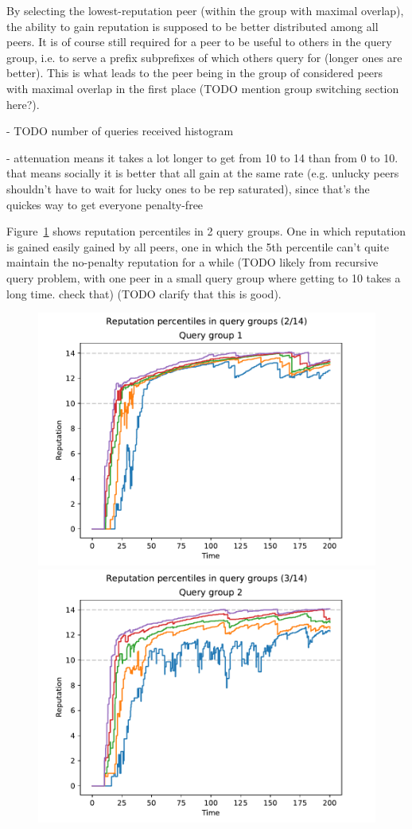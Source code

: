 By selecting the lowest-reputation peer (within the group with maximal overlap),
the ability to gain reputation is supposed to be better distributed among all
peers. It is of course still required for a peer to be useful to others in the
query group, i.e. to serve a prefix subprefixes of which others query for
(longer ones are better). This is what leads to the peer being in the group of
considered peers with maximal overlap in the first place (TODO mention group
switching section here?).

- TODO number of queries received histogram

- attenuation means it takes a lot longer to get from 10 to 14 than from 0 to
  10. that means socially it is better that all gain at the same rate (e.g.
  unlucky peers shouldn't have to wait for lucky ones to be rep saturated),
  since that's the quickes way to get everyone penalty-free

Figure~\ref{fig:selection_overlap_rep_sorted_rep_percs} shows reputation
percentiles in 2 query groups. One in which reputation is gained easily gained
by all peers, one in which the 5th percentile can't quite maintain the
no-penalty reputation for a while (TODO likely from recursive query problem,
with one peer in a small query group where getting to 10 takes a long time.
check that) (TODO clarify that this is good).

\begin{figure}[t]
\centering
\includegraphics[width=0.5\columnwidth]{figures/selection_overlap_rep_sorted_rep_percs_2_of_14}%
\includegraphics[width=0.5\columnwidth]{figures/selection_overlap_rep_sorted_rep_percs_3_of_14}
\label{fig:selection_overlap_rep_sorted_rep_percs}
\end{figure}

